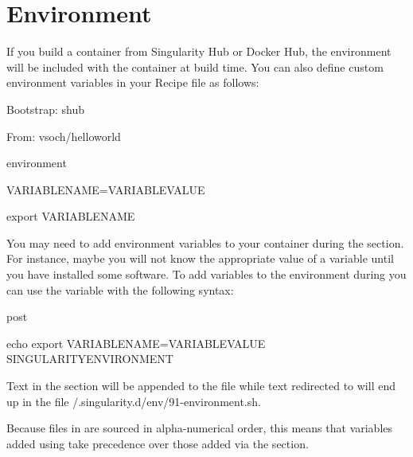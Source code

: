 \documentclass[letterpaper,10pt,english]{sphinxmanual}
\begin{document}
\section{Environment}
\label{\detokenize{environment_and_metadata:environment}}
If you build a container from Singularity Hub or Docker Hub, the
environment will be included with the container at build time. You can
also define custom environment variables in your Recipe file as follows:

%
\begin{sphinxVerbatim}[commandchars=\\\{\}]
Bootstrap: shub

From: vsoch/hello\PYGZhy{}world


\PYGZpc{}environment

    VARIABLE\PYGZus{}NAME=VARIABLE\PYGZus{}VALUE

    export VARIABLE\PYGZus{}NAME
\end{sphinxVerbatim}

You may need to add environment variables to your container during the
 section. For instance, maybe you will not know the appropriate
value of a variable until you have installed some software.
To add variables to the environment during  you can use the
 variable with the following syntax:

%
\begin{sphinxVerbatim}[commandchars=\\\{\}]
\PYGZpc{}post

    echo \PYGZsq{}export VARIABLE\PYGZus{}NAME=VARIABLE\PYGZus{}VALUE\PYGZsq{} \PYGZgt{}\PYGZgt{}\PYGZdl{}SINGULARITY\PYGZus{}ENVIRONMENT
\end{sphinxVerbatim}

Text in the  section will be appended to the file  while text redirected
to  will end up in the file /.singularity.d/env/91-environment.sh.

Because files in  are sourced in alpha-numerical order, this means that
variables added using  take precedence over those added via the 
section.
\end{document}

